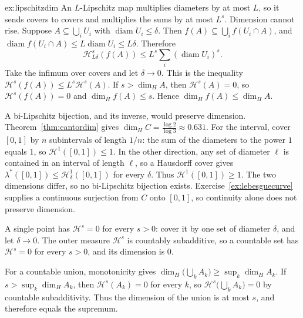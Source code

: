 \begin{solution}{ex:lipschitzdim}
\idea An $L$-Lipschitz map multiplies diameters by at most $L$, so it sends covers to covers and multiplies the sums by at most $L^s$.
Dimension cannot rise.
\writeup Suppose $A\subseteq\bigcup_i U_i$ with $\operatorname{diam}U_i\le\delta$. Then $f(A)\subseteq\bigcup_i f(U_i\cap A)$, and
$\operatorname{diam}f(U_i\cap A)\le L\operatorname{diam}U_i\le L\delta$. Therefore
\[\mathcal H^s_{L\delta}(f(A))\le L^s\sum_i(\operatorname{diam}U_i)^s.\]
Take the infimum over covers and let $\delta\to 0$. This is the inequality $\mathcal H^s(f(A))\le L^s\mathcal H^s(A)$. If $s>\dim_H A$, then
$\mathcal H^s(A)=0$, so $\mathcal H^s(f(A))=0$ and $\dim_H f(A)\le s$. Hence $\dim_H f(A)\le\dim_H A$.

A bi-Lipschitz bijection, and its inverse, would preserve dimension. Theorem~\ref{thm:cantordim} gives $\dim_H C=\frac{\log 2}{\log 3}\approx 0.631$.
For the interval, cover $[0,1]$ by $n$ subintervals of length $1/n$: the sum of the diameters to the power $1$ equals $1$, so
$\mathcal H^1([0,1])\le 1$. In the other direction, any set of diameter $\ell$ is contained in an interval of length $\ell$, so a Hausdorff
cover gives $\lambda^*([0,1])\le\mathcal H^1_\delta([0,1])$ for every $\delta$. Thus $\mathcal H^1([0,1])\ge 1$. The two dimensions differ, so
no bi-Lipschitz bijection exists. Exercise~\ref{ex:lebesguecurve} supplies a continuous surjection from $C$ onto $[0,1]$, so continuity alone
does not preserve dimension.

A single point has $\mathcal H^s=0$ for every $s>0$: cover it by one set of diameter $\delta$, and let $\delta\to 0$. The outer measure
$\mathcal H^s$ is countably subadditive, so a countable set has $\mathcal H^s=0$ for every $s>0$, and its dimension is $0$.

For a countable union, monotonicity gives $\dim_H\bigl(\bigcup_k A_k\bigr)\ge\sup_k\dim_H A_k$. If $s>\sup_k\dim_H A_k$, then
$\mathcal H^s(A_k)=0$ for every $k$, so $\mathcal H^s\bigl(\bigcup_k A_k\bigr)=0$ by countable subadditivity. Thus the dimension of the union
is at most $s$, and therefore equals the supremum.
\end{solution}

